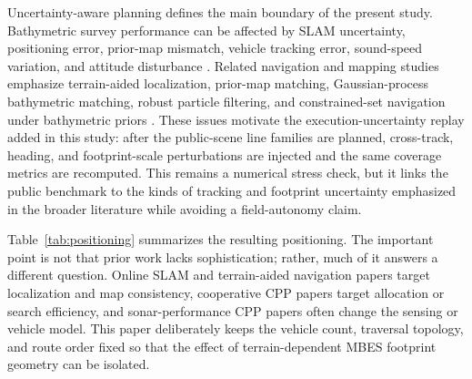 \documentclass[jmse,article,submit,moreauthors]{Definitions/mdpi}
\begin{document}
Uncertainty-aware planning defines the main boundary of the present study. Bathymetric survey performance can be affected by SLAM uncertainty, positioning error, prior-map mismatch, vehicle tracking error, sound-speed variation, and attitude disturbance \cite{yan2024dual,cao2018real,zhang2021path}. Related navigation and mapping studies emphasize terrain-aided localization, prior-map matching, Gaussian-process bathymetric matching, robust particle filtering, and constrained-set navigation under bathymetric priors \cite{zhou2017terrain,kim2017panel,zhu2025robust,ma2023terrainreview,zhang2023rbpf,ding2022contour,zhang2024ambiguouspf,sture2023gpbathy,ma2025zonotope}. These issues motivate the execution-uncertainty replay added in this study: after the public-scene line families are planned, cross-track, heading, and footprint-scale perturbations are injected and the same coverage metrics are recomputed. This remains a numerical stress check, but it links the public benchmark to the kinds of tracking and footprint uncertainty emphasized in the broader literature while avoiding a field-autonomy claim.

Table~\ref{tab:positioning} summarizes the resulting positioning. The important point is not that prior work lacks sophistication; rather, much of it answers a different question. Online SLAM and terrain-aided navigation papers target localization and map consistency, cooperative CPP papers target allocation or search efficiency, and sonar-performance CPP papers often change the sensing or vehicle model. This paper deliberately keeps the vehicle count, traversal topology, and route order fixed so that the effect of terrain-dependent MBES footprint geometry can be isolated.
\end{document}
